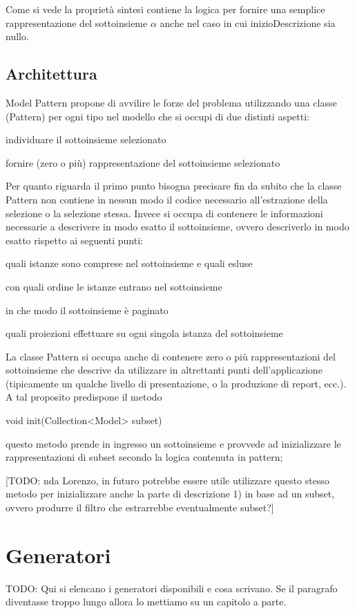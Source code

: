 Come si vede la proprietà sintesi contiene la logica per fornire una semplice rappresentazione del sottoinsieme $\alpha$ anche nel caso in cui inizioDescrizione sia nullo.



\subsection{Architettura}
Model Pattern propone di avvilire le forze del problema utilizzando una classe (Pattern) per ogni tipo nel modello che si occupi di due distinti aspetti:
\begin{enumerate*}
  \item individuare il sottoinsieme selezionato
  \item fornire (zero o più) rappresentazione del sottoinsieme selezionato
\end{enumerate*}

Per quanto riguarda il primo punto bisogna precisare fin da subito che la classe Pattern non contiene in nessun modo il codice necessario all'estrazione della selezione o la selezione stessa. Invece si occupa di contenere le informazioni necessarie a descrivere in modo esatto il sottoinsieme,  ovvero descriverlo in modo esatto rispetto ai seguenti punti:

\begin{enumerate*}
\item quali istanze sono comprese nel sottoinsieme e quali esluse
\item con quali ordine le istanze entrano nel sottoinsieme
\item in che modo il sottoinsieme è paginato
\item quali proiezioni effettuare su ogni singola istanza del sottoinsieme
\end{enumerate*}

La classe Pattern si occupa anche di contenere zero o più rappresentazioni del sottoinsieme che descrive da utilizzare in altrettanti punti dell'applicazione (tipicamente un qualche livello di presentazione, o la produzione di report, ecc.). A tal proposito predispone  il metodo

\begin{java}
    void init(Collection<Model> subset) 
\end{java}

questo metodo prende in ingresso un sottoinsieme e provvede ad inizializzare le rappresentazioni di subset secondo la logica contenuta in pattern; 

[TODO: nda Lorenzo, in futuro potrebbe essere utile utilizzare questo stesso metodo per inizializzare anche la parte di descrizione 1) in base ad un subset, ovvero produrre il filtro che estrarrebbe eventualmente subset?]


\section{Generatori}\label{sec:generatori}
TODO: Qui si elencano i generatori disponibili e cosa scrivano. Se il paragrafo diventasse troppo lungo allora lo mettiamo su un capitolo a parte.